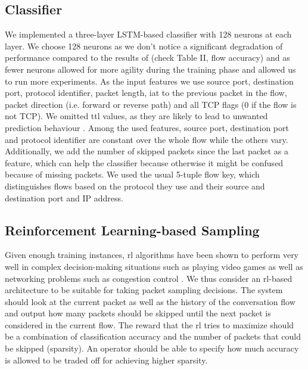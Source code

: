 \documentclass[conference]{IEEEtran}
\begin{document}
\subsection{Classifier}
\label{subsec:classifier}
We implemented a three-layer LSTM-based classifier with 128 neurons at each layer. We choose 128 neurons as we don't notice a significant degradation of performance compared to the results of \cite{hartl_explainability_2019} (check Table II, flow accuracy) and as fewer neurons allowed for more agility during the training phase and allowed us to run more experiments. As the input features we use source port, destination port, protocol identifier, packet length, \gls{iat} to the previous packet in the flow, packet direction (i.e. forward or reverse path) and all TCP flags (0 if the flow is not TCP).
We omitted \gls{ttl} values, as they are likely to lead to unwanted prediction behaviour \cite{bachl_walling_2019}.  Among the used features, source port, destination port and protocol identifier are constant over the whole flow while the others vary.
Additionally, we add the number of skipped packets since the last packet as a feature, which can help the classifier because otherwise it might be confused because of missing packets.
We used the usual 5-tuple flow key, which distinguishes flows based on the protocol they use and their source and destination port and IP address.

\subsection{Reinforcement Learning-based Sampling}
\label{subsec:rlForSampling}

Given enough training instances, \gls{rl} algorithms have been shown to perform very well in complex decision-making situations such as playing video games \cite{mnih_playing_2013} as well as networking problems such as congestion control \cite{bachl_rax_2019}. We thus consider an \gls{rl}-based architecture to be suitable for taking packet sampling decisions. The system should look at the current packet as well as the history of the conversation flow and output how many packets should be skipped until the next packet is considered in the current flow. The reward that the \gls{rl} tries to maximize should be a combination of classification accuracy and the number of packets that could be skipped (sparsity). An operator should be able to specify how much accuracy is allowed to be traded off for achieving higher sparsity.%
\end{document}
